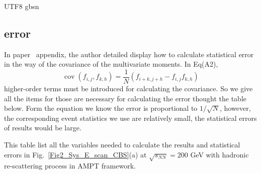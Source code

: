 \documentclass[twocolumn,showpacs,preprintnumbers,amsmath,amssymb]{revtex4-1}
\begin{document}
\begin{CJK*} {UTF8} {gbsn}
	
	  \begin{appendices} 
      \section{ error  } 
	 In paper~\cite{Luo_UrQMD} appendix, the author detailed display how to calculate statistical error in the way of the covariance of the multivariate moments.
	 In Eq(A2), 
	 \begin{equation}
\operatorname{cov}\left(f_{i, j}, f_{k, h}\right)=\frac{1}{N}\left(f_{i+k, j+h}-f_{i, j} f_{k, h}\right)
\end{equation}
higher-order terms must be introduced for calculating the covariance.
	 So we give all the items for those are necessary for calculating the error thought the table below. 
	 Form the equation we know the error is proportional to $1/\sqrt{N}$, however, the corresponding event statistics we use are relatively small, 
	 the statistical errors of results would be large.
	 	\begin{table*}[]
\scriptsize
\centering
\caption{This table list all the variables needed to calculate the results and statistical errors in Fig.~\ref{Fig2_Sys_E_scan_CBS}(a) at $\sqrt{s_{NN}} = 200$ GeV with hadronic re-scattering process in AMPT framework.}
\label{error_info}


\end{table*}
\end{appendices}
\end{CJK*}
\end{document}
